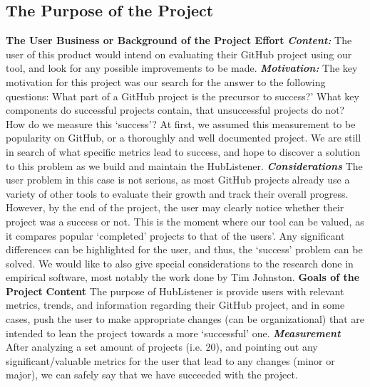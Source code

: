 \documentclass{article}
\begin{document}
\subsection{The Purpose of the Project}
\textbf{The User Business or Background of the Project Effort}
\newline
\textbf{\textit{Content:}} The user of this product would intend on evaluating their GitHub project using our tool, and look for any possible improvements to be made. \newline
\textbf{\textit{Motivation:}}\newline
The key motivation for this project was our search for the answer to the following questions: What part of a GitHub project is the precursor to success?' What key components do successful projects contain, that unsuccessful projects do not? How do we measure this ‘success’? At first, we assumed this measurement to be popularity on GitHub, or a thoroughly and well documented project. We are still in search of what specific metrics lead to success, and hope to discover a solution to this problem as we build and maintain the HubListener. \newline
\textbf{\textit{Considerations}}
The user problem in this case is not serious, as most GitHub projects already use a variety of other tools to evaluate their growth and track their overall progress. However, by the end of the project, the user may clearly notice whether their project was a success or not. This is the moment where our tool can be valued, as it compares popular ‘completed’ projects to that of the users’. Any significant differences can be highlighted for the user, and thus, the ‘success’ problem can be solved. We would like to also give special considerations to the research done in empirical software, most notably the work done by Tim Johnston. \cite{johnston2016toolkit} \newline
\newline
\textbf{Goals of the Project}
\textbf{Content}\newline
The purpose of HubListener is provide users with relevant metrics, trends, and information regarding their GitHub project, and in some cases, push the user to make appropriate changes (can be organizational) that are intended to lean the project towards a more ‘successful’ one.\newline
\textbf{\textit{Measurement}}
After analyzing a set amount of projects (i.e. 20), and pointing out any significant/valuable metrics for the user that lead to any changes (minor or major), we can safely say that we have succeeded with the project.
\end{document}
